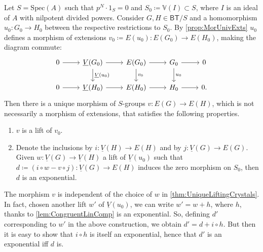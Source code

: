 \begin{thm}\label{thm:UniqueLiftingCrystals}
	Let $S = \mathrm{Spec}(A)$ such that $p^N \cdot 1_S = 0$ and
	$S_0 \coloneqq \mathbb{V}(I) \subset S$, where $I$ is
	an ideal of $A$ with nilpotent divided powers.
	Consider $G, H \in \mathsf{BT}/S$ and a homomorphism
	$u_0\colon G_0 \to H_0$ between the respective restrictions to $S_0$.
	By \cref{prop:MorUnivExts} $u_0$ defines
	a morphism of extensions $v_0 \coloneqq E(u_0)\colon E(G_0) \to E(H_0)$,
	making the diagram commute:
	\begin{equation*}
	\begin{tikzcd}
		0 \arrow[r, "", rightarrow] &
		\underline{V}(G_0) \arrow[d, "\underline{V}(u_0)", rightarrow] 
		\arrow[r, "", rightarrow] &
		E(G_0) \arrow[d, "v_0", rightarrow]
		\arrow[r, "", rightarrow] &
		G_0 \arrow[d, "u_0", rightarrow]
		\arrow[r, "", rightarrow] &
		0 \\
		0 \arrow[r, "", rightarrow] &
		\underline{V}(H_0) \arrow[r, "", rightarrow] &
		E(H_0) \arrow[r, "", rightarrow] &
		H_0 \arrow[r, "", rightarrow] &
		0
	.\end{tikzcd}
	\end{equation*}
	Then there is a unique morphism of $S$-groups
	$v\colon E(G) \to E(H)$, which is not necessarily a morphism
	of extensions, that satisfies the following properties.
\begin{enumerate}
	\item $v$ is a lift of $v_0$.

	\item Denote the inclusions by $i\colon \underline{V}(H) \to E(H)$ and by 
		$j\colon \underline{V}(G) \to E(G)$.
		Given $w\colon \underline{V}(G) \to \underline{V}(H)$ a lift of $\underline{V}(u_0)$
		such that $d\coloneqq (i \circ w - v \circ j)\colon \underline{V}(G) \to E(H)$
		induces the zero morphism on $S_0$, then $d$ is an exponential.
\end{enumerate}
\end{thm}


\begin{rem}
	The morphism $v$ is independent of the choice of $w$
	in \cref{thm:UniqueLiftingCrystals}.
	In fact, chosen another lift $w'$ of $\underline{V}(u_0)$, we 
	can write $w' = w + h$, where $h$, thanks to \cref{lem:CongruentLinComp}
	is an exponential.
	So, defining $d'$ corresponding to $w'$ in the
	above construction, we obtain $d' = d + i \circ h$.
	But then it is easy to show that $i \circ h$ is
	itself an exponential, hence that $d'$ is an
	exponential iff $d$ is.
\end{rem}


